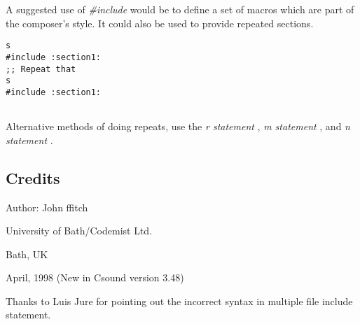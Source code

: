   A suggested use of \emph{\#include}
 would be to define a set of macros which are part of the composer's style. It could also be used to provide repeated sections. 


 
\begin{lstlisting}
s
#include :section1:
;; Repeat that
s
#include :section1:
        
\end{lstlisting}


 


  Alternative methods of doing repeats, use the \emph{r statement}
, \emph{m statement}
, and \emph{n statement}
. 
\subsection*{Credits}


 Author: John ffitch


 University of Bath/Codemist Ltd.


 Bath, UK


 April, 1998 (New in Csound version 3.48)


 Thanks to Luis Jure for pointing out the incorrect syntax in multiple file include statement.


\begin{comment}
\begin{tabular}{lcr}
Previous &Home &Next \\
Score Macros &Up &Evaluation of Expressions

\end{tabular}



\end{comment}
